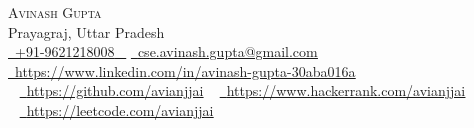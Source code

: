 \begin{center}
    {\Huge \scshape Avinash Gupta}\\ 
    \vspace{1pt}
    Prayagraj, Uttar Pradesh\\ 
    \vspace{1pt}
    \small \href{tel:+919621218008}{ \raisebox{-0.1\height}\faPhone\ \underline{+91-9621218008} ~} \href{mailto:cse.avinash.gupta123@gmail.com}{\raisebox{-0.2\height}\faEnvelope\  \underline{cse.avinash.gupta@gmail.com}} ~ 
    \href{https://www.linkedin.com/in/avinash-gupta-30aba016a}{\raisebox{-0.2\height}\faLinkedinSquare\ \underline{https://www.linkedin.com/in/avinash-gupta-30aba016a}}\\  ~
    \href{https://github.com/avianjjai}{\raisebox{-0.2\height}\faGithub\ \underline{https://github.com/avianjjai}} ~
    \href{https://www.hackerrank.com/avianjjai}{\raisebox{-0.2\height}\faHackerrank\ \underline{https://www.hackerrank.com/avianjjai}}\\ ~
    \href{https://leetcode.com/avianjjai}{\raisebox{-0.2\height}\ \underline{https://leetcode.com/avianjjai}} ~
    \vspace{-8pt}
\end{center}
